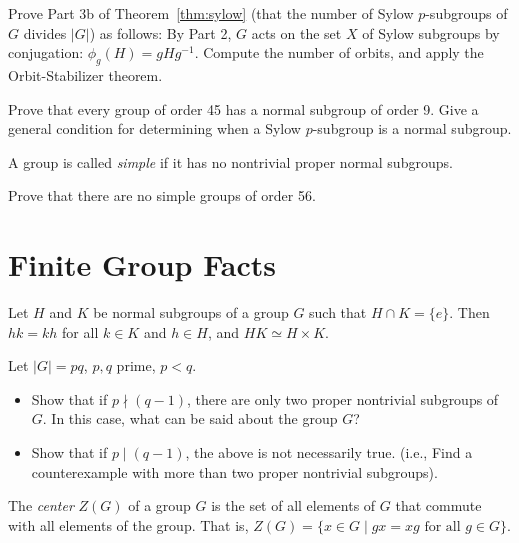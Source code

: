 \begin{problem}
Prove Part 3b of Theorem~\ref{thm:sylow} (that the number of Sylow $p$-subgroups of $G$ divides $|G|$) as follows: By Part 2, $G$ acts on the set $X$ of Sylow subgroups by conjugation: $\phi_g(H)=gHg^{-1}$. Compute the number of orbits, and apply the Orbit-Stabilizer theorem.
\end{problem}



\begin{problem}
Prove that every group of order 45 has a normal subgroup of order 9. Give a general condition for determining when a Sylow $p$-subgroup is a normal subgroup.
\end{problem}



\begin{definition}
 A group is called \emph{simple} if it has no nontrivial proper normal subgroups.
\end{definition}

\begin{problem}
Prove that there are no simple groups of order 56.
\end{problem}

\section{Finite Group Facts}

\begin{lemma}
 Let $H$ and $K$ be normal subgroups of a group $G$ such that $H\cap K = \{e\}$. Then $hk = kh$ for all $k\in K$ and $h\in H$, and $HK \simeq H\times K$.
\end{lemma}

\begin{problem}
Let $\lvert G \rvert = pq$, $p,q$ prime, $p<q$.
\begin{itemize}
 \item Show that if $p \nmid (q-1)$, there are only two proper nontrivial subgroups of $G$.  In this case, what can be said about the group $G$?
 \item Show that if $p \mid (q-1)$, the above is not necessarily true. (i.e., Find a counterexample with more than two proper nontrivial subgroups).
\end{itemize}
\end{problem}



\begin{definition}
 The \emph{center} $Z(G)$ of a group $G$ is the set of all elements of $G$ that commute with all elements of the group.  That is, $Z(G) = \{ x \in G \mid gx = xg \mbox{ for all } g \in G \}$.
\end{definition}

